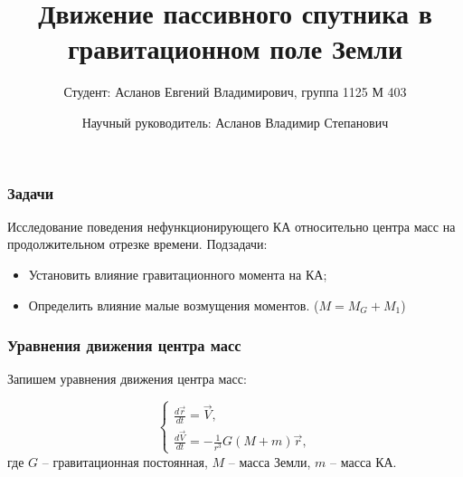 \documentclass[10pt,pdf,hyperref={unicode}]{beamer}
\title{Движение пассивного спутника в гравитационном поле Земли}
\author[Асланов Е.В.]{Студент: Асланов Евгений Владимирович, группа 1125 М 403\\ \and Научный руководитель: Асланов Владимир Степанович}
\date[\today]{}
\begin{document}
\begin{frame}
\titlepage
\end{frame} 

\begin{frame}
\frametitle{Задачи}
	Исследование поведения нефункционирующего КА относительно центра масс на продолжительном отрезке времени.
	Подзадачи: 
	\begin{itemize}
		\item Установить влияние гравитационного момента на КА;
		\item Определить влияние малые возмущения моментов. ($M = M_G + M_1$) 
	\end{itemize}
\end{frame}

\begin{frame}
\frametitle{Уравнения движения центра масс}
	Запишем уравнения движения центра масс:
	
	\begin{equation*}
		\begin{cases}
			\frac{d\vec{r}}{dt} = \vec{V},\\
			\frac{d\vec{V}}{dt} = -\frac{1}{r^3} G \left(M + m\right) \vec{r},
		\end{cases}
	\end{equation*}
	где $G$ – гравитационная постоянная, $M$ – масса Земли, $m$ – масса КА.
\end{frame}
\end{document}
